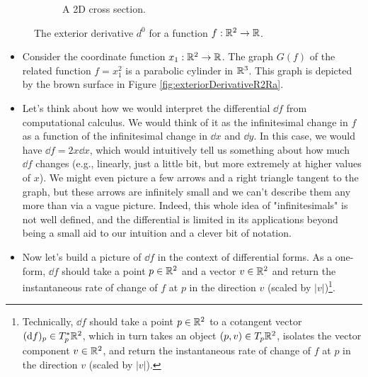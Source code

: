\documentclass[../notes.tex]{subfiles}
\begin{document}
\begin{itemize}
\begin{figure}[H]
\begin{subfigure}[b]{0.4\linewidth}
            \caption{A 2D cross section.}
            \label{fig:exteriorDerivativeR2Rb}
        \end{subfigure}
        \caption{The exterior derivative $d^0$ for a function $f:\mathbb{R}^2\to\mathbb{R}$.}
        \label{fig:exteriorDerivativeR2R}
    \end{figure}
    \begin{itemize}
        \item Consider the coordinate function $x_1:\mathbb{R}^2\to\mathbb{R}$. The graph $G(f)$ of the related function $f=x_1^2$ is a parabolic cylinder in $\mathbb{R}^3$. This graph is depicted by the brown surface in Figure \ref{fig:exteriorDerivativeR2Ra}.
        \item Let's think about how we would interpret the differential $\dd{f}$ from computational calculus. We would think of it as the infinitesimal change in $f$ as a function of the infinitesimal change in $\dd{x}$ and $\dd{y}$. In this case, we would have $\dd{f}=2x\dd{x}$, which would intuitively tell us something about how much $\dd{f}$ changes (e.g., linearly, just a little bit, but more extremely at higher values of $x$). We might even picture a few arrows and a right triangle tangent to the graph, but these arrows are infinitely small and we can't describe them any more than via a vague picture. Indeed, this whole idea of "infinitesimals" is not well defined, and the differential is limited in its applications beyond being a small aid to our intuition and a clever bit of notation.
        \item Now let's build a picture of $\dd{f}$ in the context of differential forms. As a one-form, $\dd{f}$ should take a point $p\in\mathbb{R}^2$ and a vector $v\in\mathbb{R}^2$ and return the instantaneous rate of change of $f$ at $p$ in the direction $v$ (scaled by $|v|$)\footnote{Technically, $\dd{f}$ should take a point $p\in\mathbb{R}^2$ to a cotangent vector $(\dd{f})_p\in T_p^*\mathbb{R}^2$, which in turn takes an object $(p,v)\in T_p\mathbb{R}^2$, isolates the vector component $v\in\mathbb{R}^2$, and return the instantaneous rate of change of $f$ at $p$ in the direction $v$ (scaled by $|v|$).}.

\end{itemize}
\end{itemize}
\end{document}
